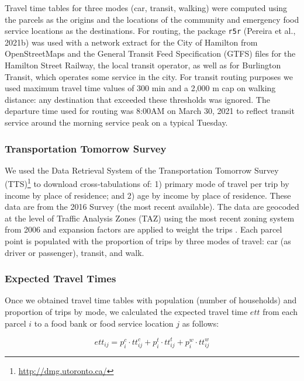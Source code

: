 \documentclass[]{elsarticle} %
\begin{document}
Travel time tables for three modes (car, transit, walking) were computed
using the parcels as the origins and the locations of the community and
emergency food service locations as the destinations. For routing, the
package \texttt{r5r} (Pereira et al., 2021b) was used with a network
extract for the City of Hamilton from OpenStreetMaps and the General
Transit Feed Specification (GTFS) files for the Hamilton Street Railway,
the local transit operator, as well as for Burlington Transit, which
operates some service in the city. For transit routing purposes we used
maximum travel time values of 300 min and a 2,000 m cap on walking
distance: any destination that exceeded these thresholds was ignored.
The departure time used for routing was 8:00AM on March 30, 2021 to
reflect transit service around the morning service peak on a typical
Tuesday.

\hypertarget{transportation-tomorrow-survey}{%
\subsubsection{Transportation Tomorrow
Survey}\label{transportation-tomorrow-survey}}

We used the Data Retrieval System of the Transportation Tomorrow Survey
(TTS)\footnote{\url{http://dmg.utoronto.ca/}} to download
cross-tabulations of: 1) primary mode of travel per trip by income by
place of residence; and 2) age by income by place of residence. These
data are from the 2016 Survey (the most recent available). The data are
geocoded at the level of Traffic Analysis Zones (TAZ) using the most
recent zoning system from 2006 and expansion factors are applied to
weight the trips . Each parcel point is populated with the proportion of
trips by three modes of travel: car (as driver or passenger), transit,
and walk.

\hypertarget{expected-travel-times}{%
\subsubsection{Expected Travel Times}\label{expected-travel-times}}

Once we obtained travel time tables with population (number of
households) and proportion of trips by mode, we calculated the expected
travel time \(ett\) from each parcel \(i\) to a food bank or food
service location \(j\) as follows:

\[
ett_{ij} = p^c_i\cdot tt^c_{ij} + p^t_i\cdot tt^t_{ij} + p^w_i\cdot tt^w_{ij}
\]
\end{document}
